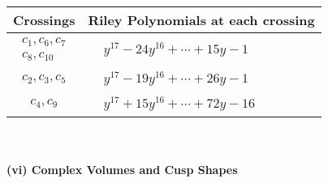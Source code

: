 \documentclass[1p]{elsarticle_modified}
\theoremstyle{definition}
\begin{document}
\begin{tabular}{m{50pt}|m{274pt}}
Crossings & \hspace{64pt}Riley Polynomials at each crossing \\
\hline $$\begin{aligned}c_{1},c_{6},c_{7}\\c_{8},c_{10}\end{aligned}$$&$\begin{aligned}
&y^{17}-24 y^{16}+\cdots+15 y-1
\end{aligned}$\\
\hline $$\begin{aligned}c_{2},c_{3},c_{5}\end{aligned}$$&$\begin{aligned}
&y^{17}-19 y^{16}+\cdots+26 y-1
\end{aligned}$\\
\hline $$\begin{aligned}c_{4},c_{9}\end{aligned}$$&$\begin{aligned}
&y^{17}+15 y^{16}+\cdots+72 y-16
\end{aligned}$\\
\hline
\end{tabular}\\~\\
\newpage\flushleft \textbf{(vi) Complex Volumes and Cusp Shapes}
\end{document}
